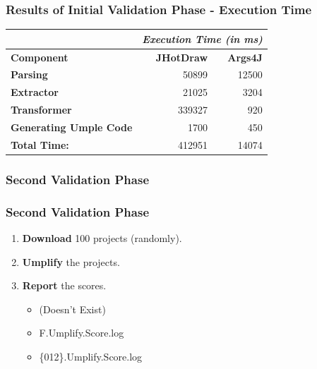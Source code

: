 \documentclass[xcolor=table]{beamer}
\begin{document}

\begin{frame}[fragile] 
\frametitle{Results of Initial Validation Phase - Execution Time}
\begin{table}[h]
\centering
\begin{tabular}{p{4cm}|rr}
\toprule
\rowcolor[HTML]{BBDAFF} 
  & \multicolumn{2}{l}{\textit{\textbf{Execution Time (in ms)}}} \\\hline
\textbf{Component}             & \textbf{JHotDraw}     & \textbf{Args4J}   \\\hline
\textbf{Parsing}               & 50899  & 12500         \\\hline
\textbf{Extractor}             & 21025  & 3204         \\\hline
\rowcolor{yellow} 
\textbf{Transformer}           & 339327 & 920          \\\hline
\textbf{Generating Umple Code} & 1700   & 450          \\\hline
\textbf{Total Time:}           & 412951 & 14074        \\\hline
\end{tabular}
\end{table}
\end{frame}

\subsubsection{Second Validation Phase}
\begin{frame}[fragile] 
\frametitle{Second Validation Phase}
\begin{enumerate}
\item \textcolor{important}{\textbf{Download}} 100 projects (randomly).
\item \textcolor{important}{\textbf{Umplify}} the projects.
\item \textcolor{important}{\textbf{Report}} the scores.
\begin{itemize}
\item (Doesn't Exist) 
\item F.Umplify.Score.log 
\item \{012\}.Umplify.Score.log 
\end{itemize}
\end{enumerate}
\end{frame}
\end{document}
